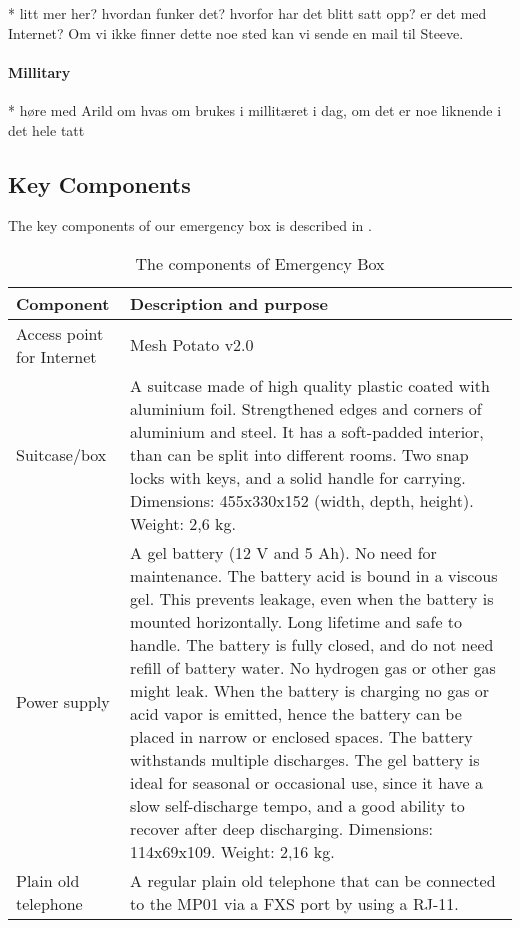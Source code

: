 * litt mer her? hvordan funker det? hvorfor har det blitt satt opp? er det med Internet? Om vi ikke finner dette noe sted kan vi sende en mail til Steeve.

\paragraph{Millitary}
* høre med Arild om hvas om brukes i millitæret i dag, om det er noe liknende i det hele tatt

\subsection{Key Components}
The key components of our emergency box is described in . 

\begin{center}
\begin{table}[h!]
\caption{\label{tab:components}The components of Emergency Box}
    \begin{tabular}{ | l | p{9cm} |}
    \hline
    \textbf{Component} & \textbf{Description and purpose} \\ 
    \hline
    Access point for Internet &  Mesh Potato v2.0\\ 
    \hline
    Suitcase/box &  A suitcase made of high quality plastic coated with aluminium foil. Strengthened edges and corners of aluminium and steel. It has a soft-padded interior, than can be split into different rooms. Two snap locks with keys, and a solid handle for carrying. Dimensions: 455x330x152 (width, depth, height). Weight: 2,6 kg. \\ 
    \hline
    Power supply & A gel battery (12 V and 5 Ah). No need for maintenance. The battery acid is bound in a viscous gel. This prevents leakage, even when the battery is mounted horizontally. Long lifetime and safe to handle. The battery is fully closed, and do not need refill of battery water. No hydrogen gas or other gas might leak. When the battery is charging no gas or acid vapor is emitted, hence the battery can be placed in narrow or enclosed spaces. The battery withstands multiple discharges. The gel battery is ideal for seasonal or occasional use, since it have a slow self-discharge tempo, and a good ability to recover after deep discharging. Dimensions: 114x69x109. Weight: 2,16 kg. \\
    \hline
    Plain old telephone &  A regular plain old telephone that can be connected to the MP01 via a FXS port by using a RJ-11. \\

\end{tabular}
\end{table}
\end{center}
